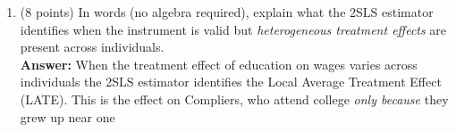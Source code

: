 \documentclass[letterpaper,12pt]{article}
\begin{document}
\begin{enumerate}[label=(\alph*)]
\item (8 points) In words (no algebra required), explain what the 2SLS estimator identifies when the instrument is valid but \emph{heterogeneous treatment effects} are present across individuals. \\
\textbf{Answer:} When the treatment effect of education on wages varies across individuals the 2SLS estimator identifies the Local Average Treatment Effect (LATE). This is the effect on Compliers, who attend college \emph{only because} they grew up near one 

\end{enumerate}
\end{document}
